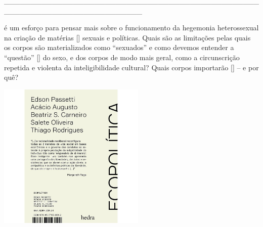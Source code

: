 \hspace*{-2cm}\_\_\_\_\_\_\_\_\_\_\_\_\_\_\_\_\_\_\_\_\_\_\_\_\_\_\_\_\_\_\_\_\_\_\_\_\_\_\_\_\_\_\_\_\_\_\_\_\_\_\_\_\_\_\_\_\_\_\_\_\_\_\_\_\_\_\_\_\_\_\_\_\_\_

\medskip

 é um esforço para pensar mais sobre o funcionamento da hegemonia heterossexual na criação de matérias [{}] sexuais e políticas. Quais são as limitações pelas quais os corpos são materializados como “sexuados” e como devemos entender a “questão” [{}] do sexo, e dos corpos de modo mais geral, como a circunscrição repetida e violenta da inteligibilidade cultural? Quais corpos importarão [{}] – e por quê?

\hspace{.5cm}

\hspace*{-.4cm}\begin{minipage}[c]{0.90\linewidth}
\small{
{}}
\end{minipage}

\pagebreak

\hspace{.5cm}

\begin{center}
\hspace*{-.5cm}\includegraphics[width=70mm]{eco.jpeg}
\end{center}

